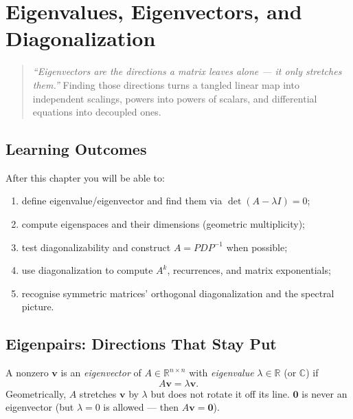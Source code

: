 \chapter{Eigenvalues, Eigenvectors, and Diagonalization}
\label{ch:eigen}

\begin{quote}
\emph{``Eigenvectors are the directions a matrix leaves alone --- it only stretches them.''} Finding those directions turns a tangled linear map into independent scalings, powers into powers of scalars, and differential equations into decoupled ones.
\end{quote}

\noindent{}
\vspace{0.4em}

\section*{Learning Outcomes}
After this chapter you will be able to:
\begin{enumerate}[label=(L\arabic*)]
    \item define eigenvalue/eigenvector and find them via $\det(A-\lambda I)=0$;
    \item compute eigenspaces and their dimensions (geometric multiplicity);
    \item test diagonalizability and construct $A=PDP^{-1}$ when possible;
    \item use diagonalization to compute $A^k$, recurrences, and matrix exponentials;
    \item recognise symmetric matrices' orthogonal diagonalization and the spectral picture.
\end{enumerate}

\section{Eigenpairs: Directions That Stay Put}
\label{sec:eigen-def}
A nonzero $\mathbf{v}$ is an \emph{eigenvector} of $A\in\mathbb{R}^{n\times n}$ with \emph{eigenvalue} $\lambda\in\mathbb{R}$ (or $\mathbb{C}$) if
\[
  A\mathbf{v}=\lambda\mathbf{v}.
\]
Geometrically, $A$ stretches $\mathbf{v}$ by $\lambda$ but does not rotate it off its line. $\mathbf{0}$ is never an eigenvector (but $\lambda=0$ is allowed --- then $A\mathbf{v}=\mathbf{0}$).

